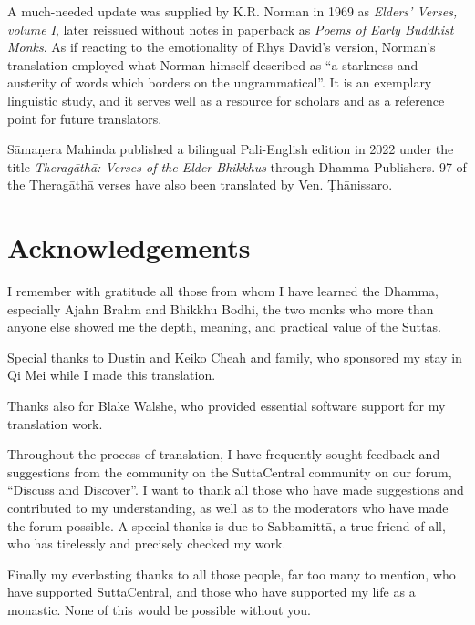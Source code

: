 \documentclass[12pt,openany]{book}%
\let\oldcontentsline\contentsline
\newcommand{\nopagecontentsline}[3]{\oldcontentsline{#1}{#2}{}}
\let\oldmainmatter\mainmatter
\renewcommand{\mainmatter}{%
\chapterfont{\setstretch{.85}\normalfont\centering}%
\sectionfont{\setstretch{.85}\normalfont\centering}%
\oldmainmatter}
\begin{document}
A much-needed update was supplied by K.R. Norman in 1969 as \textit{Elders’ Verses, volume I}, later reissued without notes in paperback as \textit{Poems of Early Buddhist Monks}. As if reacting to the emotionality of Rhys David’s version, Norman’s translation employed what Norman himself described as “a starkness and austerity of words which borders on the ungrammatical”. It is an exemplary linguistic study, and it serves well as a resource for scholars and as a reference point for future translators.

\textsanskrit{Sāmaṇera} Mahinda published a bilingual Pali-English edition in 2022 under the title \textit{\textsanskrit{Theragāthā}: Verses of the Elder Bhikkhus} through Dhamma Publishers. 97 of the \textsanskrit{Theragāthā} verses have also been translated by Ven. \textsanskrit{Ṭhānissaro}.

%
\chapter*{Acknowledgements}

I remember with gratitude all those from whom I have learned the Dhamma, especially Ajahn Brahm and Bhikkhu Bodhi, the two monks who more than anyone else showed me the depth, meaning, and practical value of the Suttas.

Special thanks to Dustin and Keiko Cheah and family, who sponsored my stay in Qi Mei while I made this translation.

Thanks also for Blake Walshe, who provided essential software support for my translation work.

Throughout the process of translation, I have frequently sought feedback and suggestions from the community on the SuttaCentral community on our forum, “Discuss and Discover”. I want to thank all those who have made suggestions and contributed to my understanding, as well as to the moderators who have made the forum possible. A special thanks is due to \textsanskrit{Sabbamittā}, a true friend of all, who has tirelessly and precisely checked my work.

Finally my everlasting thanks to all those people, far too many to mention, who have supported SuttaCentral, and those who have supported my life as a monastic. None of this would be possible without you.

%
\mainmatter%
\pagestyle{fancy}%
\end{document}
